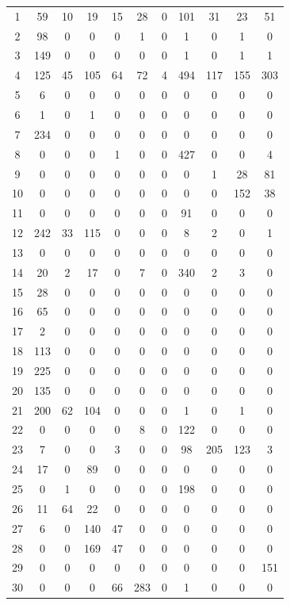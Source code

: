 \begin{longtable}[c]{|c|c|c|c|c|c|c|c|c|c|c|}
1 & 59 & 10 & 19 & 15 & 28 & 0 & 101 & 31 & 23 & 51\\
2 & 98 & 0 & 0 & 0 & 1 & 0 & 1 & 0 & 1 & 0\\
3 & 149 & 0 & 0 & 0 & 0 & 0 & 1 & 0 & 1 & 1\\
4 & 125 & 45 & 105 & 64 & 72 & 4 & 494 & 117 & 155 & 303\\
5 & 6 & 0 & 0 & 0 & 0 & 0 & 0 & 0 & 0 & 0\\
6 & 1 & 0 & 1 & 0 & 0 & 0 & 0 & 0 & 0 & 0\\
7 & 234 & 0 & 0 & 0 & 0 & 0 & 0 & 0 & 0 & 0\\
8 & 0 & 0 & 0 & 1 & 0 & 0 & 427 & 0 & 0 & 4\\
9 & 0 & 0 & 0 & 0 & 0 & 0 & 0 & 1 & 28 & 81\\
10 & 0 & 0 & 0 & 0 & 0 & 0 & 0 & 0 & 152 & 38\\
11 & 0 & 0 & 0 & 0 & 0 & 0 & 91 & 0 & 0 & 0\\
12 & 242 & 33 & 115 & 0 & 0 & 0 & 8 & 2 & 0 & 1\\
13 & 0 & 0 & 0 & 0 & 0 & 0 & 0 & 0 & 0 & 0\\
14 & 20 & 2 & 17 & 0 & 7 & 0 & 340 & 2 & 3 & 0\\
15 & 28 & 0 & 0 & 0 & 0 & 0 & 0 & 0 & 0 & 0\\
16 & 65 & 0 & 0 & 0 & 0 & 0 & 0 & 0 & 0 & 0\\
17 & 2 & 0 & 0 & 0 & 0 & 0 & 0 & 0 & 0 & 0\\
18 & 113 & 0 & 0 & 0 & 0 & 0 & 0 & 0 & 0 & 0\\
19 & 225 & 0 & 0 & 0 & 0 & 0 & 0 & 0 & 0 & 0\\
20 & 135 & 0 & 0 & 0 & 0 & 0 & 0 & 0 & 0 & 0\\
21 & 200 & 62 & 104 & 0 & 0 & 0 & 1 & 0 & 1 & 0\\
22 & 0 & 0 & 0 & 0 & 8 & 0 & 122 & 0 & 0 & 0\\
23 & 7 & 0 & 0 & 3 & 0 & 0 & 98 & 205 & 123 & 3\\
24 & 17 & 0 & 89 & 0 & 0 & 0 & 0 & 0 & 0 & 0\\
25 & 0 & 1 & 0 & 0 & 0 & 0 & 198 & 0 & 0 & 0\\
26 & 11 & 64 & 22 & 0 & 0 & 0 & 0 & 0 & 0 & 0\\
27 & 6 & 0 & 140 & 47 & 0 & 0 & 0 & 0 & 0 & 0\\
28 & 0 & 0 & 169 & 47 & 0 & 0 & 0 & 0 & 0 & 0\\
29 & 0 & 0 & 0 & 0 & 0 & 0 & 0 & 0 & 0 & 151\\
30 & 0 & 0 & 0 & 66 & 283 & 0 & 1 & 0 & 0 & 0\\

\end{longtable}
